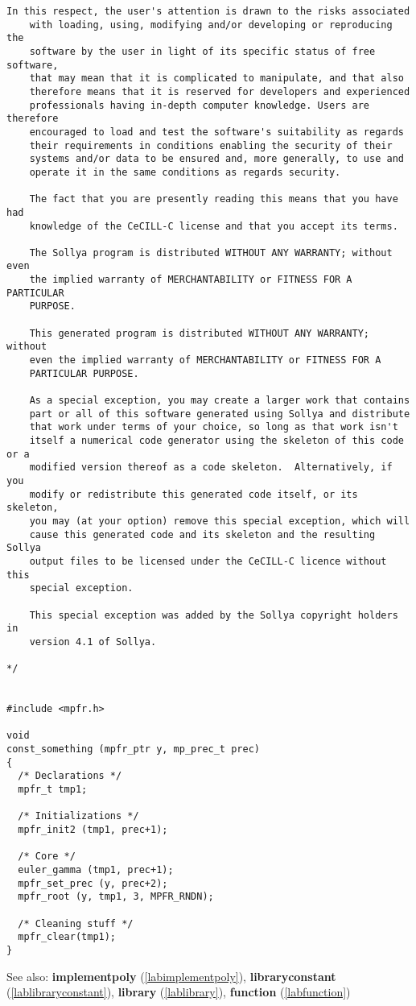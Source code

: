 \begin{center}
\begin{minipage}{15cm}
\begin{Verbatim}[frame=single]
    In this respect, the user's attention is drawn to the risks associated
    with loading, using, modifying and/or developing or reproducing the
    software by the user in light of its specific status of free software,
    that may mean that it is complicated to manipulate, and that also
    therefore means that it is reserved for developers and experienced
    professionals having in-depth computer knowledge. Users are therefore
    encouraged to load and test the software's suitability as regards
    their requirements in conditions enabling the security of their
    systems and/or data to be ensured and, more generally, to use and
    operate it in the same conditions as regards security.
    
    The fact that you are presently reading this means that you have had
    knowledge of the CeCILL-C license and that you accept its terms.
    
    The Sollya program is distributed WITHOUT ANY WARRANTY; without even
    the implied warranty of MERCHANTABILITY or FITNESS FOR A PARTICULAR
    PURPOSE.
    
    This generated program is distributed WITHOUT ANY WARRANTY; without
    even the implied warranty of MERCHANTABILITY or FITNESS FOR A
    PARTICULAR PURPOSE.
    
    As a special exception, you may create a larger work that contains
    part or all of this software generated using Sollya and distribute
    that work under terms of your choice, so long as that work isn't
    itself a numerical code generator using the skeleton of this code or a
    modified version thereof as a code skeleton.  Alternatively, if you
    modify or redistribute this generated code itself, or its skeleton,
    you may (at your option) remove this special exception, which will
    cause this generated code and its skeleton and the resulting Sollya
    output files to be licensed under the CeCILL-C licence without this
    special exception.
    
    This special exception was added by the Sollya copyright holders in
    version 4.1 of Sollya.
    
*/


#include <mpfr.h>

void
const_something (mpfr_ptr y, mp_prec_t prec)
{
  /* Declarations */
  mpfr_t tmp1;

  /* Initializations */
  mpfr_init2 (tmp1, prec+1);

  /* Core */
  euler_gamma (tmp1, prec+1);
  mpfr_set_prec (y, prec+2);
  mpfr_root (y, tmp1, 3, MPFR_RNDN);

  /* Cleaning stuff */
  mpfr_clear(tmp1);
}
\end{Verbatim}
\end{minipage}\end{center}
See also: \textbf{implementpoly} (\ref{labimplementpoly}), \textbf{libraryconstant} (\ref{lablibraryconstant}), \textbf{library} (\ref{lablibrary}), \textbf{function} (\ref{labfunction})
